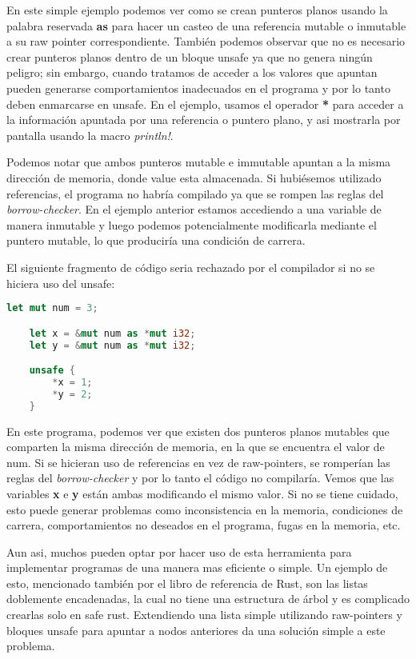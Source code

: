 En este simple ejemplo podemos ver como se crean punteros planos usando la palabra reservada \textbf{as} para hacer un casteo de una referencia mutable o inmutable a su raw pointer correspondiente. También podemos observar que no es necesario crear punteros planos dentro de un bloque unsafe ya que no genera ningún peligro; sin embargo, cuando tratamos de acceder a los valores que apuntan pueden generarse comportamientos inadecuados en el programa y por lo tanto deben enmarcarse en unsafe. En el ejemplo, usamos el operador \textbf{*} para acceder a la información apuntada por una referencia o puntero plano, y asi mostrarla por pantalla usando la macro \textit{println!}.

Podemos notar que ambos punteros mutable e immutable apuntan a la misma dirección de memoria, donde value esta almacenada. Si hubiésemos utilizado referencias, el programa no habría compilado ya que se rompen las reglas del \textit{borrow-checker}. En el ejemplo anterior estamos accediendo a una variable de manera inmutable y luego podemos potencialmente modificarla mediante el puntero mutable, lo que produciría una condición de carrera.

El siguiente fragmento de código seria rechazado por el compilador si no se hiciera uso del unsafe:
\begin{lstlisting}[language=Rust]
    let mut num = 3;

    let x = &mut num as *mut i32;
    let y = &mut num as *mut i32;

    unsafe {
        *x = 1;
        *y = 2;
    }
\end{lstlisting}

En este programa, podemos ver que existen dos punteros planos mutables que comparten la misma dirección de memoria, en la que se encuentra el valor de num. Si se hicieran uso de referencias en vez de raw-pointers, se romperían las reglas del \textit{borrow-checker} y por lo tanto el código no compilaría. Vemos que las variables \textbf{x} e \textbf{y} están ambas modificando el mismo valor. Si no se tiene cuidado, esto puede generar problemas como inconsistencia en la memoria, condiciones de carrera, comportamientos no deseados en el programa, fugas en la memoria, etc.

Aun asi, muchos pueden optar por hacer uso de esta herramienta para implementar programas de una manera mas eficiente o simple. Un ejemplo de esto, mencionado también por el libro de referencia de Rust, son las listas doblemente encadenadas, la cual no tiene una estructura de árbol y es complicado crearlas solo en safe rust. Extendiendo una lista simple utilizando raw-pointers y bloques unsafe para apuntar a nodos anteriores da una solución simple a este problema.

